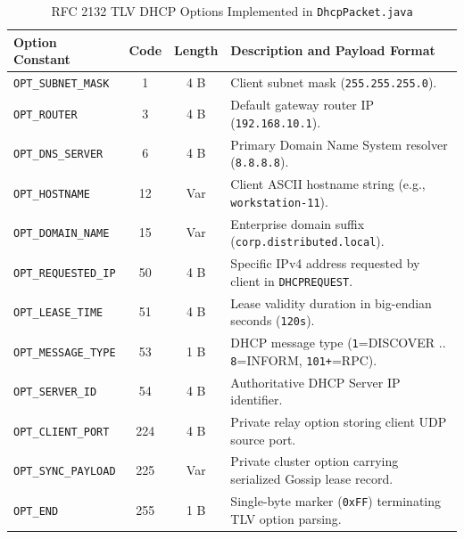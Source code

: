 \documentclass[11pt,a4paper]{article}
\begin{document}
\begin{table}[H]
\centering
\caption{RFC 2132 TLV DHCP Options Implemented in \texttt{DhcpPacket.java}}
\label{tab:tlv_options}
\small
\begin{tabularx}{\textwidth}{@{}lccY@{}}
\toprule
\textbf{Option Constant} & \textbf{Code} & \textbf{Length} & \textbf{Description and Payload Format} \\ \midrule
\texttt{OPT\_SUBNET\_MASK} & 1 & 4 B & Client subnet mask (\texttt{255.255.255.0}). \\
\texttt{OPT\_ROUTER} & 3 & 4 B & Default gateway router IP (\texttt{192.168.10.1}). \\
\texttt{OPT\_DNS\_SERVER} & 6 & 4 B & Primary Domain Name System resolver (\texttt{8.8.8.8}). \\
\texttt{OPT\_HOSTNAME} & 12 & Var & Client ASCII hostname string (e.g., \texttt{workstation-11}). \\
\texttt{OPT\_DOMAIN\_NAME} & 15 & Var & Enterprise domain suffix (\texttt{corp.distributed.local}). \\
\texttt{OPT\_REQUESTED\_IP} & 50 & 4 B & Specific IPv4 address requested by client in \texttt{DHCPREQUEST}. \\
\texttt{OPT\_LEASE\_TIME} & 51 & 4 B & Lease validity duration in big-endian seconds (\texttt{120s}). \\
\texttt{OPT\_MESSAGE\_TYPE} & 53 & 1 B & DHCP message type (\texttt{1}=DISCOVER .. \texttt{8}=INFORM, \texttt{101+}=RPC). \\
\texttt{OPT\_SERVER\_ID} & 54 & 4 B & Authoritative DHCP Server IP identifier. \\
\texttt{OPT\_CLIENT\_PORT} & 224 & 4 B & Private relay option storing client UDP source port. \\
\texttt{OPT\_SYNC\_PAYLOAD} & 225 & Var & Private cluster option carrying serialized Gossip lease record. \\
\texttt{OPT\_END} & 255 & 1 B & Single-byte marker (\texttt{0xFF}) terminating TLV option parsing. \\ \bottomrule
\end{tabularx}
\end{table}
\end{document}
